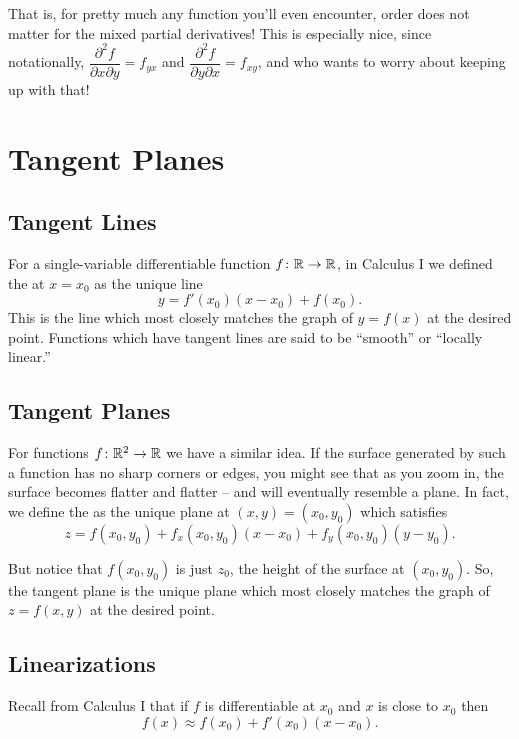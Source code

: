 That is, for pretty much any function you’ll even encounter, order does not matter for the mixed partial derivatives! This is especially nice, since notationally, \(\dfrac{\partial^{2} f}{\partial x \partial y} = f_{yx}\) and \(\dfrac{\partial^{2} f}{\partial y \partial x} = f_{xy}\), and who wants to worry about keeping up with that!

\newpage

\setcounter{section}{3}

\section{Tangent Planes}

\subsection{Tangent Lines}

For a single-variable differentiable function \(f \colon \mathbb{R} \to \mathbb{R}\), in Calculus I we defined the  at \(x = x_{0}\) as the unique line
\[
y = f'(x_{0})(x - x_{0}) + f(x_{0}).
\]
This is the line which most closely matches the graph of \(y = f(x)\) at the desired point. Functions which have tangent lines are said to be “smooth” or “locally linear.”

\subsection{Tangent Planes}

For functions \(f \colon \mathbb{R}^{2} \to \mathbb{R}\) we have a similar idea. If the surface generated by such a function has no sharp corners or edges, you might see that as you zoom in, the surface becomes flatter and flatter – and will eventually resemble a plane. In fact, we define the  as the unique plane at \((x, y) = (x_{0}, y_{0})\) which satisfies
\[
z = f(x_{0}, y_{0}) + f_{x}(x_{0}, y_{0})(x - x_{0}) + f_{y}(x_{0}, y_{0})(y - y_{0}).
\]

But notice that \(f(x_{0},y_{0})\) is just \(z_{0}\), the height of the surface at \((x_{0}, y_{0})\). So, the tangent plane is the unique plane which most closely matches the graph of \(z = f(x, y)\) at the desired point.

\subsection{Linearizations}

Recall from Calculus I that if \(f\) is differentiable at \(x_{0}\) and \(x\) is close to \(x_{0}\) then
\[
f(x) \approx f(x_{0}) + f'(x_{0})(x - x_{0}).
\]


